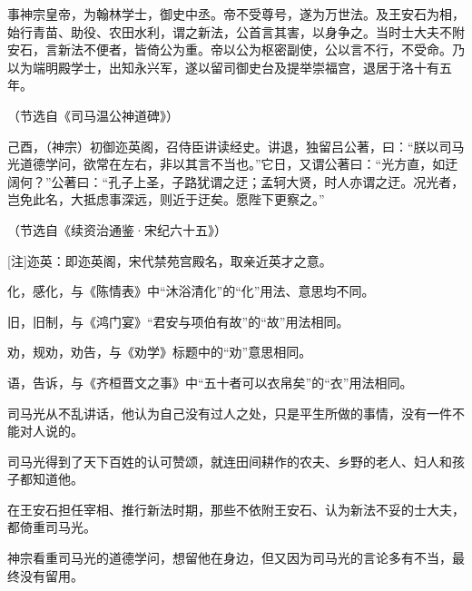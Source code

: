 \documentclass[11pt,a4paper]{ctexart}
\begin{document}
\begin{materialtext}
事神宗皇帝，为翰林学士，御史中丞。帝不受尊号，遂为万世法。及王安石为相，始行青苗、助役、农田水利，谓之新法，公首言其害，以身争之。当时士大夫不附安石，言新法不便者，皆倚公为重。帝以公为枢密副使，公以言不行，不受命。乃以为端明殿学士，出知永兴军，遂以留司御史台及提举崇福宫，退居于洛十有五年。
\end{materialtext}
\begin{flushright}（节选自《司马温公神道碑》）\end{flushright}

\begin{materialtext}
己酉，（神宗）初御迩英阁，召侍臣讲读经史。讲退，独留吕公著，曰：“朕以司马光道德学问，欲常在左右，非以其言不当也。”它日，又谓公著曰：“光方直，如迂阔何？”公著曰：“孔子上圣，子路犹谓之迂；孟轲大贤，时人亦谓之迂。况光者，岂免此名，大抵虑事深远，则近于迂矣。愿陛下更察之。”
\end{materialtext}
\begin{flushright}（节选自《续资治通鉴·宋纪六十五》）\end{flushright}

[注]迩英：即迩英阁，宋代禁苑宫殿名，取亲近英才之意。



\begin{choices}
\item 化，感化，与《陈情表》中“沐浴清化”的“化”用法、意思均不同。
\item 旧，旧制，与《鸿门宴》“君安与项伯有故”的“故”用法相同。
\item 劝，规劝，劝告，与《劝学》标题中的“劝”意思相同。
\item 语，告诉，与《齐桓晋文之事》中“五十者可以衣帛矣”的“衣”用法相同。
\end{choices}

\begin{choices}
\item 司马光从不乱讲话，他认为自己没有过人之处，只是平生所做的事情，没有一件不能对人说的。
\item 司马光得到了天下百姓的认可赞颂，就连田间耕作的农夫、乡野的老人、妇人和孩子都知道他。
\item 在王安石担任宰相、推行新法时期，那些不依附王安石、认为新法不妥的士大夫，都倚重司马光。
\item 神宗看重司马光的道德学问，想留他在身边，但又因为司马光的言论多有不当，最终没有留用。
\end{choices}
\end{document}
